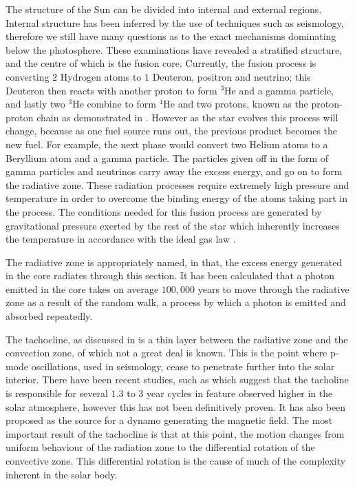 The structure of the Sun can be divided into internal and external regions.
Internal structure has been inferred by the use of techniques such as seismology, therefore we still have many questions as to the exact mechanisms dominating below the photosphere.
These examinations have revealed a stratified structure, and the centre of which is the fusion core.
Currently, the fusion process is converting $2$ Hydrogen atoms to $1$ Deuteron, positron and neutrino; this Deuteron then reacts with another proton to form ${^3}$He and a gamma particle, and lastly two $^{3}$He combine to form $^{4}$He and two protons, known as the proton-proton chain as demonstrated in \cite{Bethe1939}. 
However as the star evolves this process will change, because as one fuel source runs out, the previous product becomes the new fuel.
For example, the next phase would convert two Helium atoms to a Beryllium atom and a gamma particle.
The particles given off in the form of gamma particles and neutrinos carry away the excess energy, and go on to form the radiative zone.
These radiation processes require extremely high pressure and temperature in order to overcome the binding energy of the atoms taking part in the process.
The conditions needed for this fusion process are generated by gravitational pressure exerted by the rest of the star which inherently increases the temperature in accordance with the ideal gas law \cite{Larson2003}.

The radiative zone is appropriately named, in that, the excess energy generated in the core radiates through this section.
It has been calculated that a photon emitted in the core takes on average $100,000$ years to move through the radiative zone as a result of the random walk, a process by which a photon is emitted and absorbed repeatedly.

The tachocline, as discussed in \cite{Brun2001} is a thin layer between the radiative zone and the convection zone, of which not a great deal is known.
This is the point where p-mode oscillations, used in seismology, cease to penetrate further into the solar interior.
There have been recent studies, such as \cite{Obridko2007} which suggest that the tacholine is responsible for several $1.3$ to $3$ year cycles in feature observed higher in the solar atmosphere, however this has not been definitively proven.
It has also been proposed as the source for a dynamo generating the magnetic field.
The most important result of the tachocline is that at this point, the motion changes from uniform behaviour of the radiation zone to the differential rotation of the convective zone.
This differential rotation is the cause of much of the complexity inherent in the solar body.


